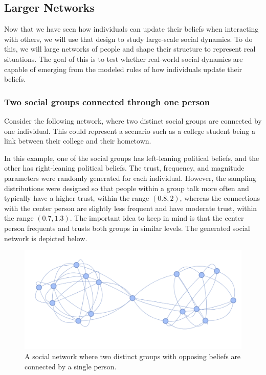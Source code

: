\documentclass[11pt]{article}
\begin{document}
\subsection{Larger Networks}

Now that we have seen how individuals can update their beliefs when interacting with others, we will use that design to study large-scale social dynamics. To do this, we will large networks of people and shape their structure to represent real situations. The goal of this is to test whether real-world social dynamics are capable of emerging from the modeled rules of how individuals update their beliefs.

\subsubsection{Two social groups connected through one person}

Consider the following network, where two distinct social groups are connected by one individual. This could represent a scenario such as a college student being a link between their college and their hometown.

In this example, one of the social groups has left-leaning political beliefs, and the other has right-leaning political beliefs. The trust, frequency, and magnitude parameters were randomly generated for each individual. However, the sampling distributions were designed so that people within a group talk more often and typically have a higher trust, within the range $(0.8,2)$, whereas the connections with the center person are slightly less frequent and have moderate trust, within the range $(0.7, 1.3).$ The important idea to keep in mind is that the center person frequents and trusts both groups in similar levels. The generated social network is depicted below.

\begin{figure}[h]
    \centering
    \includegraphics[scale=0.8]{images/two_social_groups_network.png}
    \caption{A social network where two distinct groups with opposing beliefs are connected by a single person.}
\end{figure}
\end{document}

